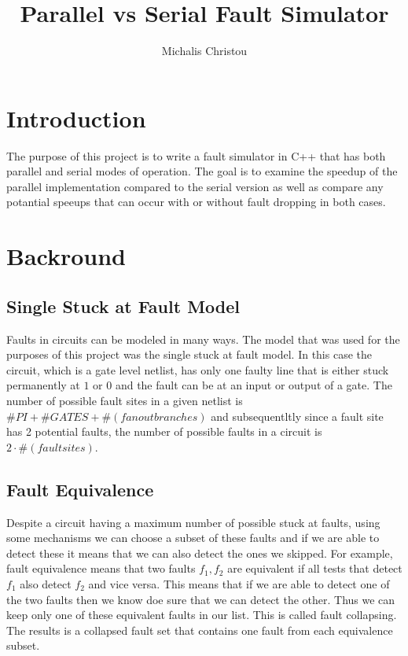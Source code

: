 \documentclass[a4paper,11pt]{article}
\author{Michalis Christou}
\title{Parallel vs Serial Fault Simulator}
\begin{document}
\maketitle

\section*{Introduction}
The purpose of this project is to write a fault simulator in C++ that has both parallel and serial modes of operation. The goal is to examine the speedup of the parallel implementation compared to the serial version as well as compare any potantial speeups that can occur with or without fault dropping in both cases.


\section*{Backround}
\subsection*{Single Stuck at Fault Model}
Faults in circuits can be modeled in many ways. The model that was used for the purposes of this project was the single stuck at fault model. In this case the circuit, which is a gate level netlist, has only one faulty line that is either stuck permanently at $1$ or $0$ and the fault can be at an input or output of a gate. The number of possible fault sites in a given netlist is $\# PI + \#GATES + \#(fanout branches)$ and subsequentltly since a fault site has 2 potential faults, the number of possible faults in a circuit is $2 \cdot \#(fault sites)$. 

\subsection*{Fault Equivalence}
Despite a circuit having a maximum number of possible stuck at faults, using some mechanisms we can choose a subset of these faults and if we are able to detect these it means that we can also detect the ones we skipped. For example, fault equivalence means that two faults $f_1, f_2$ are equivalent if all tests that detect $f_1$ also detect $f_2$ and vice versa. This means that if we are able to detect one of the two faults then we know doe sure that we can detect the other. Thus we can keep only one of these equivalent faults in our list. This is called fault collapsing. The results is a collapsed fault set that contains one fault from each equivalence subset.
\end{document}
